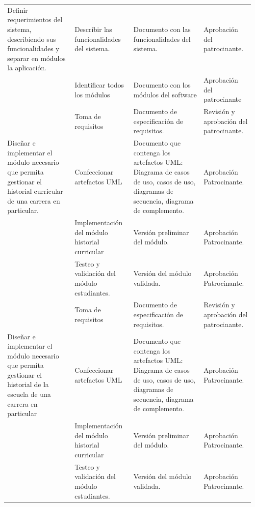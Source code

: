 \documentclass[12pt]{article}
\begin{document}
\begin{center}
\begin{longtable}{|p{4cm}|p{4cm}|p{3cm}|p{4cm}|}
			 Definir requerimientos del sistema, describiendo sus funcionalidades y separar en módulos la aplicación.
			
			& Describir las funcionalidades del sistema. & Documento con las funcionalidades del sistema. & Aprobación del patrocinante. \\ \cline{2-4}
			& Identificar todos los módulos  & Documento con los módulos del software  & Aprobación del patrocinante \\	\hline
		
		
		
		& Toma de requisitos &Documento de especificación de requisitos. & Revisión y aprobación del patrocinante.\\ 		\cline{2-4}
		
		Diseñar e implementar el módulo necesario que permita gestionar el historial curricular de una carrera en particular.
		
		& Confeccionar artefactos UML & Documento que contenga los artefactos UML: Diagrama de casos de uso, casos de uso, diagramas de secuencia, diagrama de complemento. & Aprobación Patrocinante.\\ 		\cline{2-4}
		
		& Implementación del módulo historial curricular & Versión preliminar del módulo. & Aprobación Patrocinante.\\ 	\cline{2-4}
		& Testeo y validación del módulo estudiantes. &Versión del módulo validada. & Aprobación Patrocinante.\\ 	
		\hline
		
		
		
		
		
		& Toma de requisitos &Documento de especificación de requisitos. & Revisión y aprobación del patrocinante.\\ 		\cline{2-4}

	Diseñar e implementar el módulo necesario que permita gestionar el historial de la escuela de una carrera en particular
		
		& Confeccionar artefactos UML & Documento que contenga los artefactos UML: Diagrama de casos de uso, casos de uso, diagramas de secuencia, diagrama de complemento. & Aprobación Patrocinante.\\ 		\cline{2-4}
		
		& Implementación del módulo historial curricular & Versión preliminar del módulo. & Aprobación Patrocinante.\\ 	\cline{2-4}
		& Testeo y validación del módulo estudiantes. &Versión del módulo validada. & Aprobación Patrocinante.\\ 	
		\hline
		

\end{longtable}
\end{center}
\end{document}
